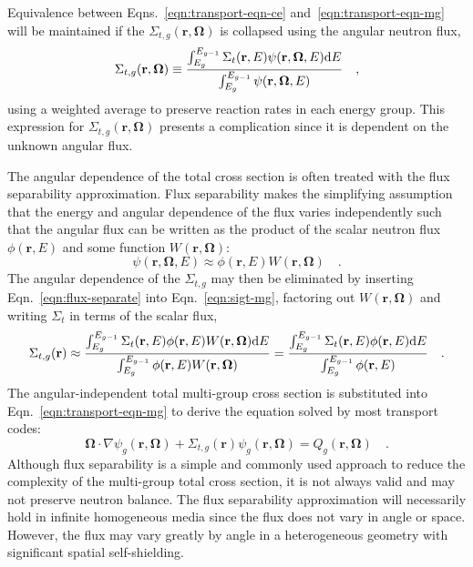 Equivalence between Eqns.~\ref{eqn:transport-eqn-ce} and~\ref{eqn:transport-eqn-mg} will be maintained if the $\Sigma_{t,g}(\mathbf{r},\mathbf{\Omega})$ is collapsed using the angular neutron flux,
%
\begin{dmath}
\label{eqn:sigt-mg}
\Sigma_{t,g}(\mathbf{r},\mathbf{\Omega}) \equiv \frac{\int\displaylimits_{E_{g}}^{E_{g-1}} \Sigma_{t}(\mathbf{r},E)\psi(\mathbf{r},\mathbf{\Omega},E)\mathrm{d}E}{\int\displaylimits_{E_{g}}^{E_{g-1}} \psi(\mathbf{r},\mathbf{\Omega},E)} \quad ,
\end{dmath}
%
using a weighted average to preserve reaction rates in each energy group. This expression for $\Sigma_{t,g}(\mathbf{r},\mathbf{\Omega})$ presents a complication since it is dependent on the unknown angular flux.

The angular dependence of the total cross section is often treated with the flux separability approximation. Flux separability makes the simplifying assumption that the energy and angular dependence of the flux varies independently such that the angular flux can be written as the product of the scalar neutron flux $\phi(\mathbf{r},E)$ and some function $W(\mathbf{r}, \mathbf{\Omega})$:
%
\begin{dmath}
\label{eqn:flux-separate}
\psi(\mathbf{r},\mathbf{\Omega},E) \approx \phi(\mathbf{r},E) W(\mathbf{r},\mathbf{\Omega}) \quad .
\end{dmath}
%
The angular dependence of the $\Sigma_{t,g}$ may then be eliminated by inserting Eqn.~\ref{eqn:flux-separate} into Eqn.~\ref{eqn:sigt-mg}, factoring out $W(\mathbf{r},\mathbf{\Omega})$ and writing $\Sigma_{t}$ in terms of the scalar flux,
%
\begin{dmath}
\label{eqn:sigt-mg-scalar}
\Sigma_{t,g}(\mathbf{r}) \approx \frac{\int\displaylimits_{E_{g}}^{E_{g-1}} \Sigma_{t}(\mathbf{r},E)\phi(\mathbf{r},E)W(\mathbf{r},\mathbf{\Omega})\mathrm{d}E}{\int\displaylimits_{E_{g}}^{E_{g-1}} \phi(\mathbf{r},E)W(\mathbf{r},\mathbf{\Omega})} = \frac{\int\displaylimits_{E_{g}}^{E_{g-1}} \Sigma_{t}(\mathbf{r},E)\phi(\mathbf{r},E)\mathrm{d}E}{\int\displaylimits_{E_{g}}^{E_{g-1}} \phi(\mathbf{r},E)} \quad .
\end{dmath}
%
The angular-independent total multi-group cross section is substituted into Eqn.~\ref{eqn:transport-eqn-mg} to derive the equation solved by most transport codes:
%
\begin{dmath}
\label{eqn:transport-eqn-mg-separate}
\mathbf{\Omega} \cdot \nabla \psi_{g}(\mathbf{r},\mathbf{\Omega}) + \Sigma_{t,g}(\mathbf{r})\psi_{g}(\mathbf{r},\mathbf{\Omega}) = Q_{g}(\mathbf{r},\mathbf{\Omega}) \quad .
\end{dmath}
%
Although flux separability is a simple and commonly used approach to reduce the complexity of the multi-group total cross section, it is not always valid and may not preserve neutron balance. The flux separability approximation will necessarily hold in infinite homogeneous media since the flux does not vary in angle or space. However, the flux may vary greatly by angle in a heterogeneous geometry with significant spatial self-shielding.

